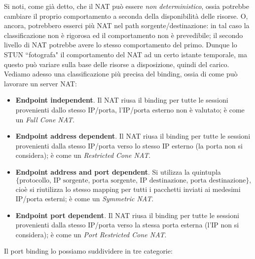 Si noti, come già detto, che il NAT può essere \textit{non deterministico}, ossia potrebbe cambiare il proprio comportamento a seconda della disponibilità delle risorse. O, ancora, potrebbero esserci più NAT nel path sorgente/destinazione: in tal caso la classificazione non è rigorosa ed il comportamento non è prevedibile; il secondo livello di NAT potrebbe avere lo stesso comportamento del primo. Dunque lo STUN \textquotedblleft fotografa" il comportamento del NAT ad un certo istante temporale, ma questo può variare sulla base delle risorse a disposizione, quindi del carico.\\
Vediamo adesso una classificazione più precisa del binding, ossia di come può lavorare un server NAT:
\begin{itemize}
	\item \textbf{Endpoint independent}. Il NAT riusa il binding per tutte le sessioni provenienti dallo stesso IP/porta, l'IP/porta esterno non è valutato; è come un \textit{Full Cone NAT}.
	
	\item \textbf{Endpoint address dependent}. Il NAT riusa il binding per tutte le sessioni provenienti dalla stesso IP/porta verso lo stesso IP esterno (la porta non si considera); è come un \textit{Restricted Cone NAT}.
	
	\item \textbf{Endpoint address and port dependent}. Si utilizza la quintupla $$\{\text{protocollo, IP sorgente, porta sorgente, IP destinazione, porta destinazione}\},$$ cioè si riutilizza lo stesso mapping per tutti i pacchetti inviati ai medesimi IP/porta esterni; è come un \textit{Symmetric NAT}.
	
	\item \textbf{Endpoint port dependent}. Il NAT riusa il binding per tutte le sessioni provenienti dalla stesso IP/porta verso la stessa porta esterna (l'IP non si considera); è come un \textit{Port Restricted Cone NAT}.
\end{itemize}
Il port binding lo possiamo suddividere in tre categorie:
